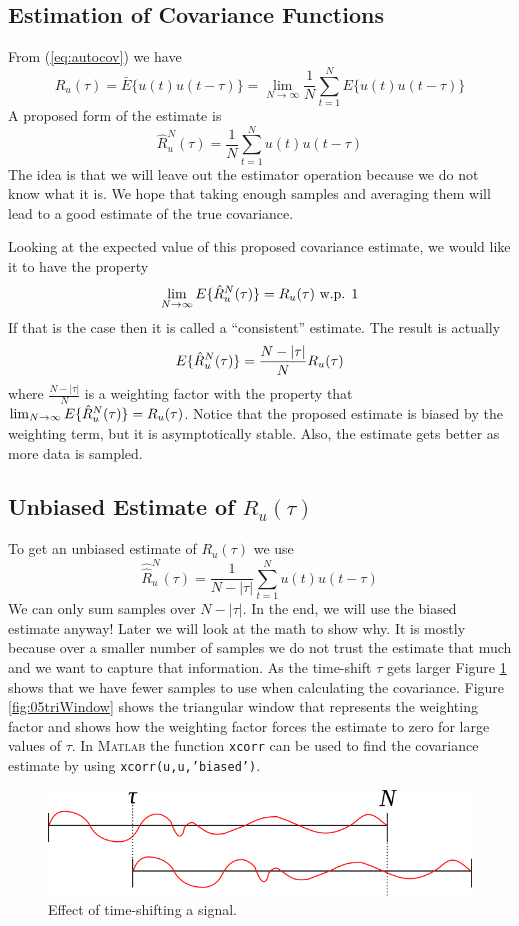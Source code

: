 \subsection{Estimation of Covariance Functions}
From (\ref{eq:autocov}) we have
$$R_u(\tau) = \bar{E}\{u(t)u(t-\tau)\} = \lim_{N\to\infty}\frac{1}{N}\sum_{t=1}^N E\{u(t)u(t-\tau)\}$$
A proposed form of the estimate is
$$\hat{R}_u^N(\tau) = \frac{1}{N}\sum_{t=1}^Nu(t)u(t-\tau)$$
The idea is that we will leave out the estimator operation because we do not know what it is. We hope that taking enough samples and averaging them will lead to a good estimate of the true covariance.

Looking at the expected value of this proposed covariance estimate, we would like it to have the property
$$\lim_{N\to\infty} E\{\hat{R}_u^N(\tau)\} = R_u(\tau) \text{ w.p. } 1$$
If that is the case then it is called a ``consistent'' estimate. The result is actually
\begin{align}
\label{eq:autocovest}
E\{\hat{R}_u^N(\tau)\} = \frac{N-|\tau|}{N}R_u(\tau)
\end{align}
where $\frac{N-|\tau|}{N}$ is a weighting factor with the property that $\lim_{N\to\infty}E\{\hat{R}_u^N(\tau)\}=R_u(\tau)$. Notice that the proposed estimate is biased by the weighting term, but it is asymptotically stable. Also, the estimate gets better as more data is sampled.

\subsection{Unbiased Estimate of $R_u(\tau)$}
To get an unbiased estimate of $R_u(\tau)$ we use
$$\hat{\hat{R}}_u^N(\tau) = \frac{1}{N-|\tau|}\sum_{t=1}^Nu(t)u(t-\tau)$$
We can only sum samples over $N-|\tau|$. In the end, we will use the biased estimate anyway! Later we will look at the math to show why. It is mostly because over a smaller number of samples we do not trust the estimate that much and we want to capture that information. As the time-shift $\tau$ gets larger Figure \ref{fig:05timeShift} shows that we have fewer samples to use when calculating the covariance. Figure \ref{fig:05triWindow} shows the triangular window that represents the weighting factor and shows how the weighting factor forces the estimate to zero for large values of $\tau$. In \textsc{Matlab} the function \texttt{xcorr} can be used to find the covariance estimate by using \texttt{xcorr(u,u,'biased')}.
\begin{figure}[ht!]
	\centering
	\includegraphics[width=.6\textwidth]{images/05timeShift}
	\caption{Effect of time-shifting a signal.}
	\label{fig:05timeShift}
\end{figure}

